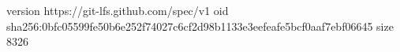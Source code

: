 version https://git-lfs.github.com/spec/v1
oid sha256:0bfc05599fe50b6e252f74027c6cf2d98b1133e3eefeafe5bcf0aaf7ebf06645
size 8326
